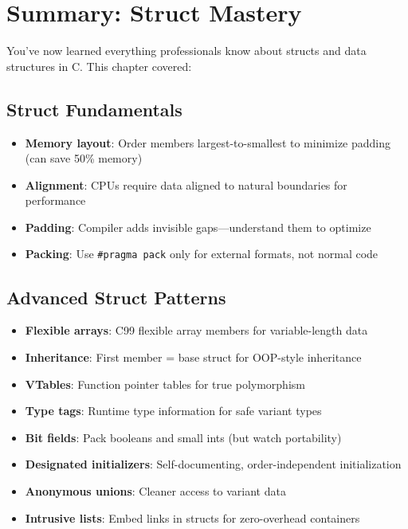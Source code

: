 \section{Summary: Struct Mastery}

You've now learned everything professionals know about structs and data structures in C. This chapter covered:

\subsection{Struct Fundamentals}

\begin{itemize}
    \item \textbf{Memory layout}: Order members largest-to-smallest to minimize padding (can save 50\% memory)
    \item \textbf{Alignment}: CPUs require data aligned to natural boundaries for performance
    \item \textbf{Padding}: Compiler adds invisible gaps---understand them to optimize
    \item \textbf{Packing}: Use \texttt{\#pragma pack} only for external formats, not normal code
\end{itemize}

\subsection{Advanced Struct Patterns}

\begin{itemize}
    \item \textbf{Flexible arrays}: C99 flexible array members for variable-length data
    \item \textbf{Inheritance}: First member = base struct for OOP-style inheritance
    \item \textbf{VTables}: Function pointer tables for true polymorphism
    \item \textbf{Type tags}: Runtime type information for safe variant types
    \item \textbf{Bit fields}: Pack booleans and small ints (but watch portability)
    \item \textbf{Designated initializers}: Self-documenting, order-independent initialization
    \item \textbf{Anonymous unions}: Cleaner access to variant data
    \item \textbf{Intrusive lists}: Embed links in structs for zero-overhead containers
\end{itemize}

